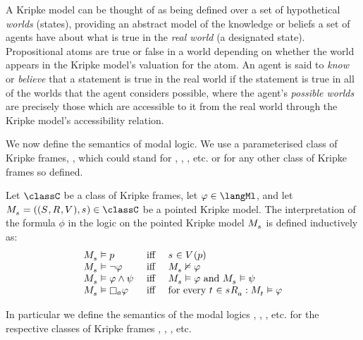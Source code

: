 A Kripke model can be thought of as being defined over a set of hypothetical {\em worlds} (states), providing an abstract model of the knowledge or beliefs a set of agents have about what is true in the {\em real world} (a designated state).
Propositional atoms are true or false in a world depending on whether the world appears in the Kripke model's valuation for the atom.
An agent is said to {\em know} or {\em believe} that a statement is true in the real world if the statement is true in all of the worlds that the agent considers possible, where the agent's {\em possible worlds} are precisely those which are accessible to it from the real world through the Kripke model's accessibility relation.

We now define the semantics of modal logic.
We use a parameterised class of Kripke frames, \classC{}, which could stand for \classK{}, \classKF{}, \classKFF{}, etc. or for any other class of Kripke frames so defined.

\begin{definition}\label{ml-semantics}
Let $\classC$ be a class of Kripke frames, let $\phi \in \langMl$, and let $\kPModelAndTuple{\kStateS} \in \classC$ be a pointed Kripke model.
The interpretation of the formula $\phi$ in the logic \logicC{} on the pointed Kripke model $\kPModel{\kStateS}$ is defined inductively as:
$$
\begin{array}{lcl}
\kPModel{\kStateS} \entails \atomP & \text{ iff } & \kStateS \in \kValuation(\atomP)\\
\kPModel{\kStateS} \entails \lnot \phi & \text{ iff } & \kPModel{\kStateS} \nentails \phi\\
\kPModel{\kStateS} \entails \phi \land \psi & \text{ iff } & \kPModel{\kStateS} \entails \phi \text{ and } \kPModel{\kStateS} \entails \psi\\
\kPModel{\kStateS} \entails \necessaryA \phi & \text{ iff } & \text{for every } \kStateT \in \kSuccessorsA{\kStateS} : \kPModel{\kStateT} \entails \phi
\end{array}
$$
\end{definition}

In particular we define the semantics of the modal logics \logicK{}, \logicKF{}, \logicKFF{}, etc. for the respective classes of Kripke frames \classK{}, \classKF{}, \classKFF{}, etc.

